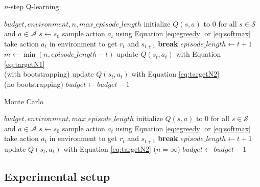 \documentclass{article}
\begin{document}
\newpage

\begin{algorithm}[htbp]
    \caption{$n$-step Q-learning}
    \label{alg:nstep}
 \begin{algorithmic}
     $budget, environment, n, max\_episode\_length$
    \STATE initialize $Q(s, a)$ to $0$ for all $s \in \mathcal{S}$ and $a \in \mathcal{A}$
    \REPEAT
    \STATE $s \gets s_0$
        \STATE sample action $a_t$ using Equation \ref{eq:egreedy} or \ref{eq:softmax}
        \STATE take action $a_t$ in environment to get $r_t$ and $s_{t+1}$
            \STATE \textbf{break}
        \ENDIF
    \ENDFOR
    \STATE $episode\_length \gets t+1$
        \STATE $m \gets \min(n, episode\_length - t)$
            \STATE update $Q(s_t, a_t)$ with Equation \ref{eq:targetN1} \\ (with bootstrapping)
        \ELSE
            \STATE update $Q(s_t, a_t)$ with Equation \ref{eq:targetN2} \\ (no bootstrapping)
        \ENDIF
    \ENDFOR
    \STATE $budget \gets budget - 1$
\end{algorithmic}
\end{algorithm}

\begin{algorithm}[htbp]
    \caption{Monte Carlo}
    \label{alg:montecarlo}
 \begin{algorithmic}
     $budget, environment, max\_episode\_length$
    \STATE initialize $Q(s, a)$ to $0$ for all $s \in \mathcal{S}$ and $a \in \mathcal{A}$
    \REPEAT
    \STATE $s \gets s_0$
        \STATE sample action $a_t$ using Equation \ref{eq:egreedy} or \ref{eq:softmax}
        \STATE take action $a_t$ in environment to get $r_t$ and $s_{t+1}$
            \STATE \textbf{break}
        \ENDIF
    \ENDFOR
    \STATE $episode\_length \gets t+1$
        \STATE update $Q(s_t, a_t)$ with Equation \ref{eq:targetN2} ($n = \infty$)
    \ENDFOR
    \STATE $budget \gets budget - 1$
\end{algorithmic}
\end{algorithm}

\subsection{Experimental setup}
\label{sssec:setup}
\end{document}

